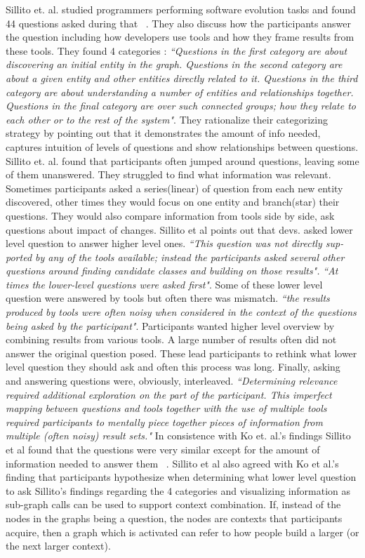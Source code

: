 Sillito et. al.  studied programmers performing software evolution tasks and found 44 questions asked during that ~\cite{Sillito:2006}. They also discuss how the participants answer the question including how developers use tools and how they frame results from these tools. They found 4 categories : \textit{``Questions in the first category are about discovering an initial entity in the graph. Questions in the second category are about a given entity and other entities directly related to it. Questions in the third category are about understanding a number of entities and relationships together. Questions in the final category are over such connected groups; how they relate to each other or to the rest of the system"}. They rationalize their categorizing strategy by pointing out that it demonstrates the amount of info needed, captures intuition of levels of questions and show relationships between questions. Sillito et. al. found that participants often jumped around questions, leaving some of them unanswered. They struggled to find what information was relevant. Sometimes participants asked a series(linear) of question from each new entity discovered, other times they would focus on one entity and branch(star) their questions. They would also compare information from tools side by side, ask questions about impact of changes.
Sillito et al points out that devs. asked lower level question to answer higher level ones. \textit{``This question was not directly sup- ported by any of the tools available; instead the participants asked several other questions around finding candidate classes and building on those results".} \textit{``At times the lower-level questions were asked first"}. Some of these lower level question were answered by tools but often there was mismatch. \textit{``the results produced by tools were often noisy when considered in the context of the questions being asked by the participant"}. Participants wanted higher level overview by combining results from various tools. A large number of results often did not answer the original question posed. These lead participants to rethink what lower level question they should ask and often this process was long. Finally, asking and answering questions were, obviously, interleaved. \textit{``Determining relevance required additional exploration on the part of the participant. This imperfect mapping between questions and tools together with the use of multiple tools required participants to mentally piece together pieces of information from multiple (often noisy) result sets." }
In consistence with Ko et. al.'s findings Sillito et al found that the questions were very similar except for the amount of information needed to answer them ~\cite{Ko:2007,Fritz:2010,Sillito:2006}. Sillito et al also agreed with Ko et al.’s finding that participants hypothesize when determining what lower level question to ask 
Sillito’s findings regarding the 4 categories and visualizing information as sub-graph calls can be used to support context combination. If, instead of the nodes in the graphs being a question, the nodes are contexts that participants acquire, then a graph which is activated can refer to how people build a larger (or the next larger context).  

